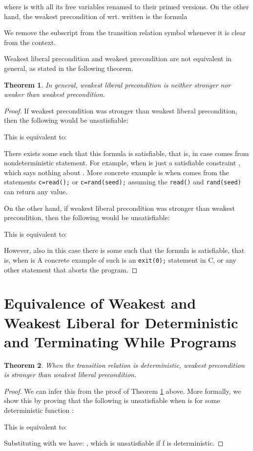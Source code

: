 \documentclass[times]{elsarticle}
\newtheorem{theorem}{Theorem}
\begin{document}
where  is  with all
its free variables renamed to their primed versions. On the other hand,
the weakest precondition of  wrt.  written
 is the formula

We remove the subscript  from the transition relation symbol
whenever it is clear from the context.

Weakest liberal precondition and weakest precondition are not
equivalent in general, as stated in the following theorem.
\begin{theorem} \label{theorem:neither}
In general, weakest liberal precondition is neither stronger nor weaker than weakest precondition.
\end{theorem}

\begin{proof}
If weakest precondition was stronger than weakest liberal
precondition, then the following would be unsatisfiable: 

This is equivalent to:

There exists some  such that this formula is satisfiable, that is,
in case  comes from nondeterministic statement. For example, when
 is just a satisfiable constraint , which says nothing
about . More concrete example is when  comes from the
statements \texttt{c=read();} or \texttt{c=rand(seed);} assuming the
\texttt{read()} and \texttt{rand(seed)} can return any value.

On the other hand, if weakest liberal precondition was stronger than
weakest precondition, then the following would be unsatisfiable:

This is equivalent to:

However, also in this case there is some  such that the formula is
satisfiable, that is, when  is  A concrete example
of such  is an \texttt{exit(0);} statement in C, or any other
statement that aborts the program.
\end{proof}

\section{Equivalence of Weakest and Weakest Liberal 
for Deterministic and Terminating While Programs}
\label{sec:equivalence}


\begin{theorem} \label{theorem:wpstronger}
  When the transition relation is deterministic, weakest precondition 
  is stronger than weakest liberal precondition.
\end{theorem}

\begin{proof}
  We can infer this from the proof of Theorem \ref{theorem:neither}
  above.  More formally, we show this by proving that the following is
  unsatisfiable when  is  for some
  deterministic function :

This is equivalent to:

Substituting  with  we have: , 
which is unsatisfiable if f is deterministic. 
\end{proof}
\end{document}
